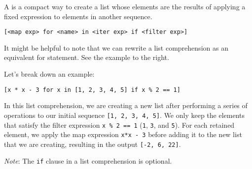 A  is a compact way to create a list whose elements
are the results of applying a fixed expression to elements in another sequence.
\begin{center}
\texttt{[<map exp> for <name> in <iter exp> if <filter exp>]}
\end{center}
It might be helpful to note that we can rewrite a list comprehension as an
equivalent for statement. See the example to the right.

Let's break down an example:
\begin{center}
\texttt{[x * x - 3 for x in [1, 2, 3, 4, 5] if x \% 2 == 1]}
\end{center}

In this list comprehension, we are creating a new list after performing a
series of operations to our initial sequence \texttt{[1, 2, 3, 4, 5]}. We only
keep the elements that satisfy the filter expression \texttt{x \% 2 == 1}
(\texttt{1}, \texttt{3}, and \texttt{5}). For each retained element, we apply
the map expression \texttt{x*x - 3} before adding it to the new list that we are
creating, resulting in the output \texttt{[-2, 6, 22]}.

\emph{Note}: The \texttt{if} clause in a list comprehension is optional.

